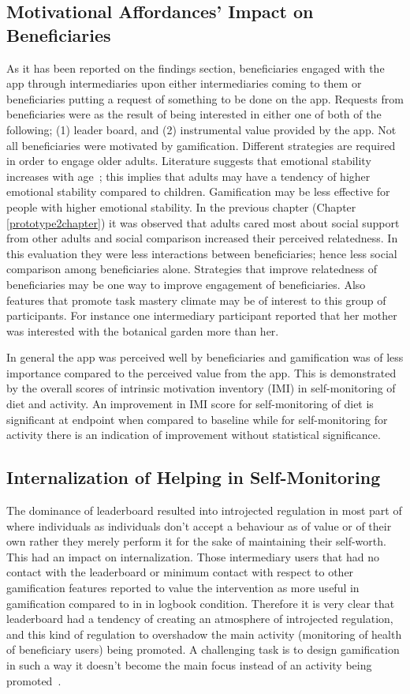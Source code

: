\subsection{Motivational Affordances' Impact on Beneficiaries}
As it has been reported on the findings section, beneficiaries engaged with the app through intermediaries upon either intermediaries coming to them or beneficiaries putting a request of something to be done on the app. Requests from beneficiaries were as the result of being interested in either one of both of the following; (1) leader board, and (2) instrumental value provided by the app. Not all beneficiaries were motivated by gamification. Different strategies are required in order to engage older adults. Literature suggests that emotional stability increases with age~\citep{carstensen2011emotional}; this implies that adults may have a tendency of higher emotional stability compared to children. Gamification may be less effective for people with higher emotional stability. In the previous chapter (Chapter \ref{prototype2chapter}) it was observed that adults cared most about social support from other adults and social comparison increased their perceived relatedness. In this evaluation they were less interactions between beneficiaries; hence less social comparison among beneficiaries alone. Strategies that improve relatedness of beneficiaries may be one way to improve engagement of beneficiaries. Also features that promote task mastery climate may be of interest to this group of participants. For instance one intermediary participant reported that her mother was interested with the botanical garden more than her. 

In general the app was perceived well by beneficiaries and gamification was of less importance compared to the perceived value from the app. This is demonstrated by the overall scores of intrinsic motivation inventory (IMI) in self-monitoring of diet and activity. An improvement in IMI score for self-monitoring of diet is significant at endpoint when compared to baseline while for self-monitoring for activity there is an indication of improvement without statistical significance.      
\subsection{Internalization of Helping in Self-Monitoring}
The dominance of leaderboard resulted into introjected regulation in most part of where individuals as individuals don't accept a behaviour as of value or of their own rather they merely perform it for the sake of maintaining their self-worth. This had an impact on internalization. Those intermediary users that had no contact with the leaderboard or minimum contact with respect to other gamification features reported to value the intervention as more useful in gamification compared to in in logbook condition. Therefore it is very clear that leaderboard had a tendency of creating an atmosphere of introjected regulation, and this kind of regulation  to overshadow the main activity  (monitoring of health of beneficiary users) being promoted. A challenging task is to design gamification in such a way it doesn't become the main focus instead of an activity being promoted~\citep{knaving2013designing}.

